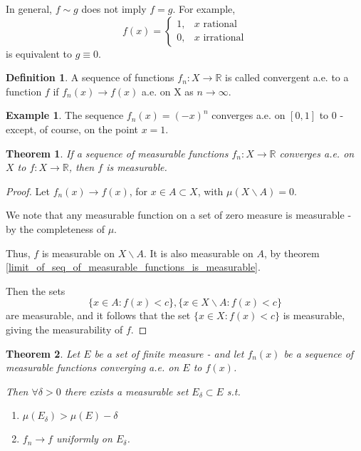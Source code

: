 \documentclass[11pt,a4paper]{report}
\theoremstyle{plain}
\newtheorem{thm}{Theorem}[section]
\theoremstyle{definition}
\newtheorem*{defn}{Definition}
\newtheorem*{eg}{Example}
\theoremstyle{remark}
\newcommand{\R}{\mathbb{R}}
\begin{document}
In general, $f \sim g$ does not imply $f = g$. For example,
$$ f(x) = \begin{cases}
    1, &x \text{ rational} \\
    0, &x \text{ irrational}
  \end{cases} $$ is equivalent to $g \equiv 0$.

\begin{defn}
  A sequence of functions $f_n : X \rightarrow \R$ is called convergent a.e. to a function $f$ if $f_n(x) \rightarrow f(x)$ a.e. on X as $n \rightarrow \infty$. 
\end{defn}

\begin{eg}
  The sequence $f_n(x) = (-x)^n$ converges a.e. on $[0, 1]$ to $0$ - except, of course, on the point $x = 1$.
\end{eg}

\begin{thm}\label{limit_of_ae_measurable_sequence_is_measurable}
  If a sequence of measurable functions $f_n : X \rightarrow \R$ converges a.e. on $X$ to $f: X \rightarrow \R$, then $f$ is measurable.
\end{thm}

\begin{proof}
  Let $f_n(x) \rightarrow f(x)$, for $x \in A \subset X$, with $\mu(X \backslash A) = 0$.

  We note that any measurable function on a set of zero measure is measurable - by the completeness of $\mu$.

  Thus, $f$ is measurable on $X \backslash A$. It is also measurable on $A$, by theorem \ref{limit_of_seq_of_measurable_functions_is_measurable}.

  Then the sets $$ \{ x \in A : f(x) < c \}, \{ x \in X \backslash A : f(x) < c \} $$ are measurable, and it follows that the set $\{ x \in X : f(x) < c \}$ is measurable, giving the measurability of $f$.
\end{proof}

\begin{thm}
    Let $E$ be a set of finite measure - and let $f_n(x)$ be a sequence of measurable functions converging a.e. on $E$ to $f(x)$. 

    Then $\forall \delta > 0$ there exists a measurable set $E_\delta \subset E$ s.t. 
    \begin{enumerate}
        \item $\mu(E_\delta) > \mu(E) - \delta$
        \item $f_n \rightarrow f$ uniformly on $E_\delta$.
    \end{enumerate}
\end{thm}
\end{document}
